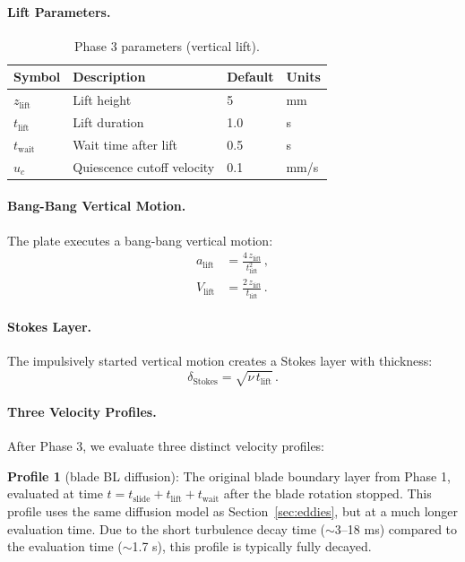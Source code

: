 \documentclass[11pt,a4paper]{article}
\begin{document}
\paragraph{Lift Parameters.}
\begin{table}[H]
\centering
\caption{Phase 3 parameters (vertical lift).}
\label{tab:lift_params}
\begin{tabular}{llll}
\toprule
Symbol & Description & Default & Units \\
\midrule
$z_\mathrm{lift}$ & Lift height & 5 & mm \\
$t_\mathrm{lift}$ & Lift duration & 1.0 & s \\
$t_\mathrm{wait}$ & Wait time after lift & 0.5 & s \\
$u_c$ & Quiescence cutoff velocity & 0.1 & mm/s \\
\bottomrule
\end{tabular}
\end{table}

\paragraph{Bang-Bang Vertical Motion.}
The plate executes a bang-bang vertical motion:
\begin{align}
  a_\mathrm{lift} &= \frac{4\,z_\mathrm{lift}}{t_\mathrm{lift}^2}\,,
    \label{eq:alift} \\
  V_\mathrm{lift} &= \frac{2\,z_\mathrm{lift}}{t_\mathrm{lift}}\,.
    \label{eq:Vlift}
\end{align}

\paragraph{Stokes Layer.}
The impulsively started vertical motion creates a Stokes layer with
thickness:
\begin{equation}
  \delta_\mathrm{Stokes} = \sqrt{\nu\, t_\mathrm{lift}}\,.
  \label{eq:delta_stokes}
\end{equation}

\paragraph{Three Velocity Profiles.}
After Phase 3, we evaluate three distinct velocity profiles:

\textbf{Profile 1} (blade BL diffusion): The original blade boundary
layer from Phase 1, evaluated at time $t = t_\mathrm{slide} + t_\mathrm{lift}
+ t_\mathrm{wait}$ after the blade rotation stopped. This profile uses the
same diffusion model as Section~\ref{sec:eddies}, but at a much longer
evaluation time. Due to the short turbulence decay time ($\sim$3--18 ms)
compared to the evaluation time ($\sim$1.7 s), this profile is typically
fully decayed.
\end{document}
